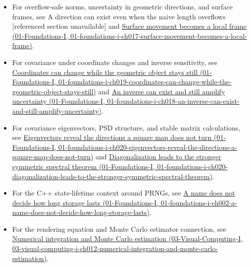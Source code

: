\begin{itemize}
\tightlist
\item
  For overflow-safe norms, uncertainty in geometric directions, and surface frames, see {A direction can exist even when the naive length overflows {[}referenced section unavailable{]}} and \href{../01-Foundations-I/main.pdf\#nameddest=01-foundations-i-ch017-surface-movement-becomes-a-local-frame}{Surface movement becomes a local frame (01-Foundations-I, 01-foundations-i-ch017-surface-movement-becomes-a-local-frame)}.
\item
  For covariance under coordinate changes and inverse sensitivity, see \href{../01-Foundations-I/main.pdf\#nameddest=01-foundations-i-ch019-coordinates-can-change-while-the-geometric-object-stays-still}{Coordinates can change while the geometric object stays still (01-Foundations-I, 01-foundations-i-ch019-coordinates-can-change-while-the-geometric-object-stays-still)} and \href{../01-Foundations-I/main.pdf\#nameddest=01-foundations-i-ch018-an-inverse-can-exist-and-still-amplify-uncertainty}{An inverse can exist and still amplify uncertainty (01-Foundations-I, 01-foundations-i-ch018-an-inverse-can-exist-and-still-amplify-uncertainty)}.
\item
  For covariance eigenvectors, PSD structure, and stable matrix calculations, see \href{../01-Foundations-I/main.pdf\#nameddest=01-foundations-i-ch020-eigenvectors-reveal-the-directions-a-square-map-does-not-turn}{Eigenvectors reveal the directions a square map does not turn (01-Foundations-I, 01-foundations-i-ch020-eigenvectors-reveal-the-directions-a-square-map-does-not-turn)} and \href{../01-Foundations-I/main.pdf\#nameddest=01-foundations-i-ch020-diagonalization-leads-to-the-stronger-symmetric-spectral-theorem}{Diagonalization leads to the stronger symmetric spectral theorem (01-Foundations-I, 01-foundations-i-ch020-diagonalization-leads-to-the-stronger-symmetric-spectral-theorem)}.
\item
  For the C++ state-lifetime context around PRNGs, see \href{../01-Foundations-I/main.pdf\#nameddest=01-foundations-i-ch002-a-name-does-not-decide-how-long-storage-lasts}{A name does not decide how long storage lasts (01-Foundations-I, 01-foundations-i-ch002-a-name-does-not-decide-how-long-storage-lasts)}.
\item
  For the rendering equation and Monte Carlo estimator connection, see \href{../03-Visual-Computing-I/main.pdf\#nameddest=03-visual-computing-i-ch012-numerical-integration-and-monte-carlo-estimation}{Numerical integration and Monte Carlo estimation (03-Visual-Computing-I, 03-visual-computing-i-ch012-numerical-integration-and-monte-carlo-estimation)}.
\end{itemize}


